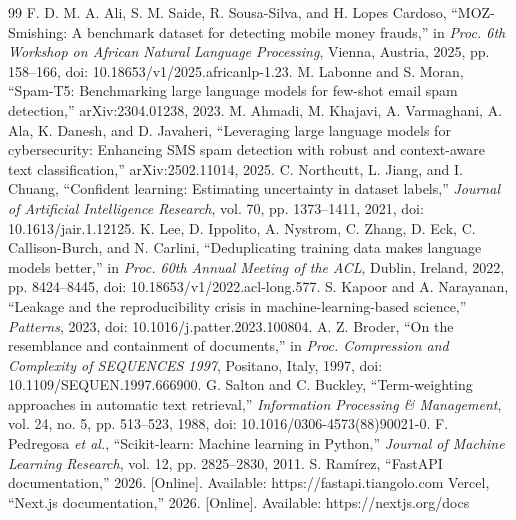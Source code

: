 \documentclass[12pt,a4paper]{report}
\begin{document}
\begin{thebibliography}{99}
 F. D. M. A. Ali, S. M. Saide, R. Sousa-Silva, and H. Lopes Cardoso, ``MOZ-Smishing: A benchmark dataset for detecting mobile money frauds,'' in \textit{Proc. 6th Workshop on African Natural Language Processing}, Vienna, Austria, 2025, pp. 158--166, doi: 10.18653/v1/2025.africanlp-1.23.
 M. Labonne and S. Moran, ``Spam-T5: Benchmarking large language models for few-shot email spam detection,'' arXiv:2304.01238, 2023.
 M. Ahmadi, M. Khajavi, A. Varmaghani, A. Ala, K. Danesh, and D. Javaheri, ``Leveraging large language models for cybersecurity: Enhancing SMS spam detection with robust and context-aware text classification,'' arXiv:2502.11014, 2025.
 C. Northcutt, L. Jiang, and I. Chuang, ``Confident learning: Estimating uncertainty in dataset labels,'' \textit{Journal of Artificial Intelligence Research}, vol. 70, pp. 1373--1411, 2021, doi: 10.1613/jair.1.12125.
 K. Lee, D. Ippolito, A. Nystrom, C. Zhang, D. Eck, C. Callison-Burch, and N. Carlini, ``Deduplicating training data makes language models better,'' in \textit{Proc. 60th Annual Meeting of the ACL}, Dublin, Ireland, 2022, pp. 8424--8445, doi: 10.18653/v1/2022.acl-long.577.
 S. Kapoor and A. Narayanan, ``Leakage and the reproducibility crisis in machine-learning-based science,'' \textit{Patterns}, 2023, doi: 10.1016/j.patter.2023.100804.
 A. Z. Broder, ``On the resemblance and containment of documents,'' in \textit{Proc. Compression and Complexity of SEQUENCES 1997}, Positano, Italy, 1997, doi: 10.1109/SEQUEN.1997.666900.
 G. Salton and C. Buckley, ``Term-weighting approaches in automatic text retrieval,'' \textit{Information Processing \& Management}, vol. 24, no. 5, pp. 513--523, 1988, doi: 10.1016/0306-4573(88)90021-0.
 F. Pedregosa \textit{et al.}, ``Scikit-learn: Machine learning in Python,'' \textit{Journal of Machine Learning Research}, vol. 12, pp. 2825--2830, 2011.
 S. Ram\'irez, ``FastAPI documentation,'' 2026. [Online]. Available: https://fastapi.tiangolo.com
 Vercel, ``Next.js documentation,'' 2026. [Online]. Available: https://nextjs.org/docs
\end{thebibliography}
\end{document}
